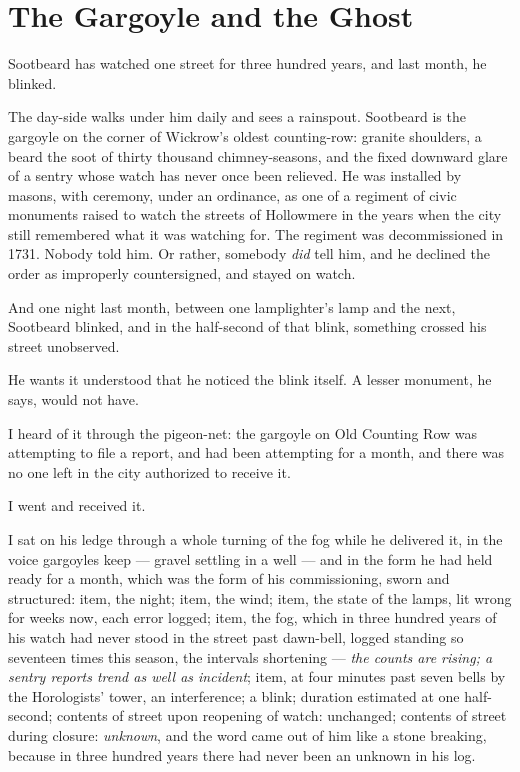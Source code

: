\chapter{The Gargoyle and the Ghost}

Sootbeard has watched one street for three hundred years, and last month, he blinked.

The day-side walks under him daily and sees a rainspout. Sootbeard is the gargoyle on the corner of Wickrow's oldest counting-row: granite shoulders, a beard the soot of thirty thousand chimney-seasons, and the fixed downward glare of a sentry whose watch has never once been relieved. He was installed by masons, with ceremony, under an ordinance, as one of a regiment of civic monuments raised to watch the streets of Hollowmere in the years when the city still remembered what it was watching for. The regiment was decommissioned in 1731. Nobody told him. Or rather, somebody \emph{did} tell him, and he declined the order as improperly countersigned, and stayed on watch.

And one night last month, between one lamplighter's lamp and the next, Sootbeard blinked, and in the half-second of that blink, something crossed his street unobserved.

He wants it understood that he noticed the blink itself. A lesser monument, he says, would not have.

I heard of it through the pigeon-net: the gargoyle on Old Counting Row was attempting to file a report, and had been attempting for a month, and there was no one left in the city authorized to receive it.

I went and received it.

I sat on his ledge through a whole turning of the fog while he delivered it, in the voice gargoyles keep --- gravel settling in a well --- and in the form he had held ready for a month, which was the form of his commissioning, sworn and structured: item, the night; item, the wind; item, the state of the lamps, lit wrong for weeks now, each error logged; item, the fog, which in three hundred years of his watch had never stood in the street past dawn-bell, logged standing so seventeen times this season, the intervals shortening --- \emph{the counts are rising; a sentry reports trend as well as incident}; item, at four minutes past seven bells by the Horologists' tower, an interference; a blink; duration estimated at one half-second; contents of street upon reopening of watch: unchanged; contents of street during closure: \emph{unknown}, and the word came out of him like a stone breaking, because in three hundred years there had never been an unknown in his log.

